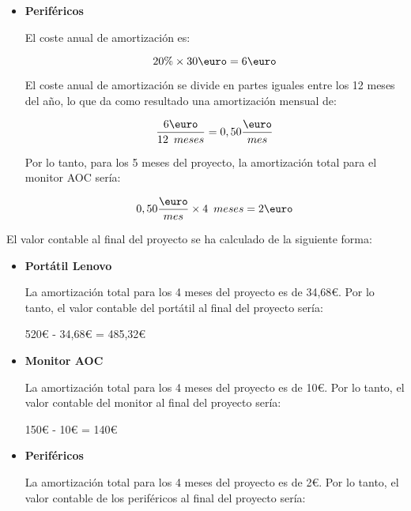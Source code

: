 \begin{itemize}
\begin{itemize}
    \item \textbf{Periféricos} 

    El coste anual de amortización es:  

    \begin{center}
        $$ 20\% \times 30 \text{\euro} = 6 \text{\euro} $$
    \end{center}
    
    El coste anual de amortización se divide en partes iguales entre los 12 meses del año, lo que da como resultado una amortización mensual de: 

    \begin{center}
        $$ \frac{6 \text{\euro}}{12 \hspace{0.5em}meses}=0,50\frac{\text{\euro}}{mes}  $$
    \end{center}

    Por lo tanto, para los 5 meses del proyecto, la amortización total para el monitor AOC sería: 

    \begin{center}
        $$ 0,50\frac{\text{\euro}}{mes}\times4\hspace{0.5em}meses=2\text{\euro}  $$
    \end{center}
\end{itemize}

El valor contable al final del proyecto se ha calculado de la siguiente forma:
\begin{itemize}
    \item \textbf{Portátil Lenovo} 
    
    La amortización total para los 4 meses del proyecto es de 34,68€. Por lo tanto, el valor contable del portátil al final del proyecto sería: 

    \begin{center}
        520€ - 34,68€ = 485,32€
    \end{center}

    \item \textbf{Monitor AOC} 

    La amortización total para los 4 meses del proyecto es de 10€. Por lo tanto, el valor contable del monitor al final del proyecto sería: 

    \begin{center}
        150€ - 10€ = 140€
    \end{center}

    \item \textbf{Periféricos}
    
    La amortización total para los 4 meses del proyecto es de 2€. Por lo tanto, el valor contable de los periféricos al final del proyecto sería: 


\end{itemize}
\end{itemize}
